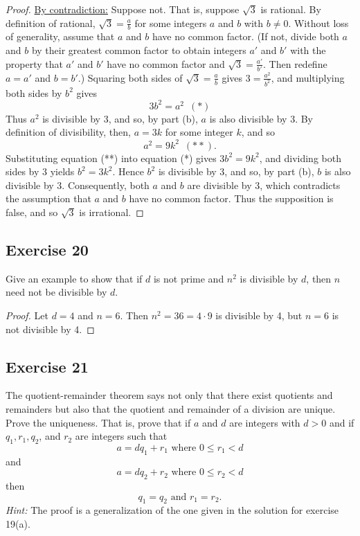 \documentclass[14pt]{extarticle}
\begin{document}
\begin{proof}
    \underline{By contradiction:} Suppose not. That is,
    suppose $\sqrt{3}$ is rational. By definition of rational,
    $\sqrt{3} = \frac{a}{b}$ for some integers $a$ and $b$ with $b \neq 0$. Without loss of generality, assume that $a$ and $b$ have no common factor. (If not, divide both $a$ and $b$ by their greatest common factor to obtain integers $a'$ and $b'$ with the property that $a'$ and $b'$ have no common factor and $\sqrt{3} = \frac{a'}{b'}$. Then redefine $a = a'$ and $b = b'$.) Squaring both sides of $\sqrt{3} = \frac{a}{b}$ gives $3 = \frac{a^2}{b^2}$, and multiplying both sides by $b^2$ gives
    \[
        3b^2 = a^2 \,\,\,(*)
    \]
    Thus $a^2$ is divisible by 3, and so, by part (b), $a$ is also divisible by 3. By definition of divisibility, then, $a = 3k$ for some integer $k$, and so
    \[
        a^2 = 9k^2 \,\,\,(**).
    \]
    Substituting equation (**) into equation (*) gives $3b^2 = 9k^2$, and dividing both sides by 3 yields $b^2 = 3k^2$. Hence $b^2$ is divisible by 3, and so, by part (b), $b$ is also divisible by 3. Consequently, both $a$ and $b$ are divisible by 3, which contradicts the assumption that $a$ and $b$ have no common factor. Thus the supposition is false, and so $\sqrt{3}$ is irrational.
\end{proof}

\subsection{Exercise 20}
Give an example to show that if $d$ is not prime and $n^2$ is divisible by $d$, then $n$ need not be divisible by $d$.

\begin{proof}
    Let $d = 4$ and $n = 6$. Then $n^2 = 36 = 4 \cdot 9$ is divisible by 4, but $n = 6$ is not divisible by 4.
\end{proof}

\subsection{Exercise 21}
The quotient-remainder theorem says not only that there exist quotients and remainders but also that the quotient and remainder of a division are unique. Prove the uniqueness. That is, prove that if $a$ and $d$ are integers with $d > 0$ and if $q_1, r_1, q_2$, and $r_2$ are integers such that
\[
    a = dq_1 + r_1 \text{ where } 0 \leq r_1 < d
\]
and
\[
    a = dq_2 + r_2 \text{ where } 0 \leq r_2 < d
\]
then
\[
    q_1 = q_2 \text{ and } r_1 = r_2.
\]
{\it Hint:} The proof is a generalization of the one given in the solution for exercise 19(a).
\end{document}
